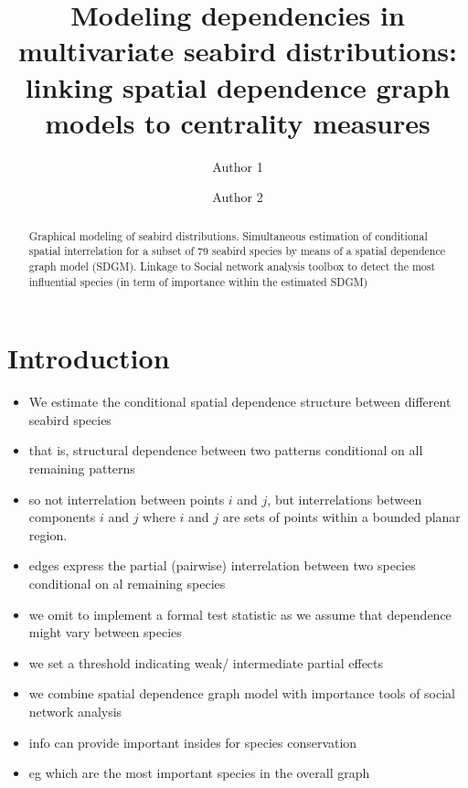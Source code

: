 \documentclass{statsoc}
\title[Modeling dependencies in multivariate seabird distributions]{Modeling dependencies in multivariate seabird distributions: linking spatial dependence graph models to centrality measures}
\author[Author 1 {\it et al.}]{Author 1}
\author{Author 2}
\begin{document}



\begin{abstract}
  Graphical modeling of seabird distributions. Simultaneous estimation of conditional spatial interrelation for a subset of $79$ seabird species by means of a spatial dependence graph model (SDGM). Linkage to Social network analysis toolbox to detect the most influential species (in term of importance within the estimated SDGM)  
\end{abstract}




\section{Introduction}

\begin{itemize}
\item We estimate the conditional spatial dependence structure between different seabird species
\item that is, structural dependence between two patterns conditional on all remaining patterns
\item so not interrelation between points $i$ and $j$, but interrelations between components $i$ and $j$ where $i$ and $j$ are sets of points within a bounded planar region.
\item edges express the partial (pairwise) interrelation between two species conditional on al remaining species
\item we omit to implement a formal test statistic as we assume that dependence might vary between species
\item we set a threshold indicating weak/ intermediate partial effects
\item we combine spatial dependence graph model with importance tools of social network analysis
\item info can provide important insides for species conservation
\item eg which are the most important species in the overall graph
\end{itemize}
\end{document}
